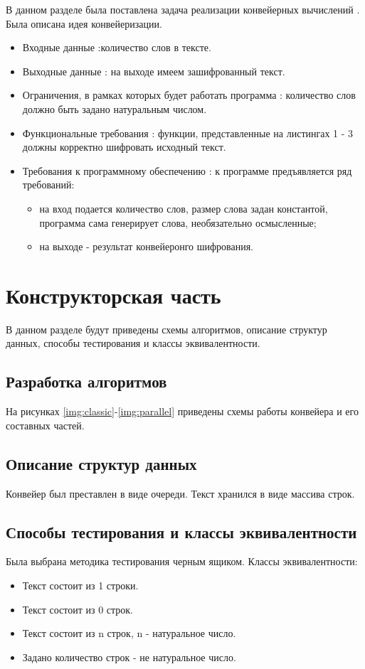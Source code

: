В данном разделе была поставлена задача реализации  конвейерных вычислений . Была описана идея конвейеризации. 

\begin{itemize}
	\item Входные данные :количество слов в тексте.
	\item Выходные данные : на выходе имеем зашифрованный текст.
	\item Ограничения, в рамках которых будет работать программа : количество слов должно быть задано натуральным числом.
	\item Функциональные требования : функции, представленные на листингах 1 - 3 должны корректно шифровать исходный текст.
	\item Требования к программному обеспечению : к программе предъявляется ряд требований:
			\begin{itemize}
			    \item на вход подается количество слов, размер слова задан константой, программа сама генерирует слова, необязательно осмысленные;
			    \item на выходе - результат конвейеронго шифрования.
			\end{itemize}
\end{itemize}

\section{Конструкторская часть}
В данном разделе будут приведены схемы  алгоритмов, описание структур данных, способы тестирования и классы эквивалентности.

\subsection{Разработка алгоритмов}

На рисунках \ref{img:classic}-\ref{img:parallel} приведены схемы работы конвейера и его составных частей.

\subsection{Описание структур данных}
Конвейер был преставлен в виде очереди. Текст хранился в виде массива строк.

\subsection{Способы тестирования и классы эквивалентности}
Была выбрана методика тестирования черным ящиком. 
Классы эквивалентности:
\begin{itemize}
	\item Текст состоит из 1 строки.
	\item Текст состоит из 0 строк.
	\item Текст состоит из n строк, n - натуральное число.
	\item Задано количество строк - не натуральное число.
\end{itemize}
